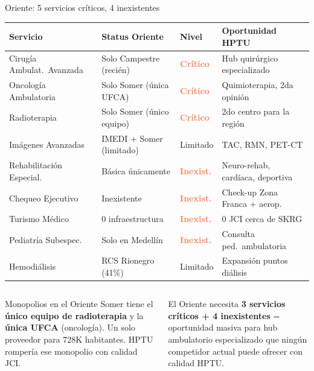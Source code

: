 \documentclass[aspectratio=169, 11pt]{beamer}
\newcommand{\danger}[1]{\textcolor{coral}{\textbf{#1}}}
\begin{document}
{
\begin{frame}{Oriente: 5 servicios críticos, 4 inexistentes}

\vspace{-2pt}
{\scriptsize\setlength{\tabcolsep}{3pt}
\begin{tabular}{@{}p{3.0cm}p{3.2cm}lp{4.0cm}@{}}
\toprule
\textbf{Servicio} & \textbf{Status Oriente} & \textbf{Nivel} & \textbf{Oportunidad HPTU} \\
\midrule
\rowcolor{coral!10}
Cirugía Ambulat.\ Avanzada & Solo Campestre (recién) & \danger{Crítico} & Hub quirúrgico especializado \\
\rowcolor{coral!10}
Oncología Ambulatoria & Solo Somer (única UFCA) & \danger{Crítico} & Quimioterapia, 2da opinión \\
\rowcolor{coral!10}
Radioterapia & Solo Somer (único equipo) & \danger{Crítico} & 2do centro para la región \\
Imágenes Avanzadas & IMEDI + Somer (limitado) & Limitado & TAC, RMN, PET-CT \\
\rowcolor{coral!6}
Rehabilitación Especial. & Básica únicamente & \danger{Inexist.} & Neuro-rehab, cardíaca, deportiva \\
\rowcolor{coral!6}
Chequeo Ejecutivo & Inexistente & \danger{Inexist.} & Check-up Zona Franca + aerop. \\
\rowcolor{coral!6}
Turismo Médico & 0 infraestructura & \danger{Inexist.} & 0 JCI cerca de SKRG \\
\rowcolor{coral!6}
Pediatría Subespec. & Solo en Medellín & \danger{Inexist.} & Consulta ped.\ ambulatoria \\
Hemodiálisis & RCS Rionegro (41\%) & Limitado & Expansión puntos diálisis \\
\bottomrule
\end{tabular}
}

\vspace{6pt}
\begin{columns}[T]
\begin{alertblock}{\small Monopolios en el Oriente}
\scriptsize
Somer tiene el \textbf{único equipo de radioterapia} y la \textbf{única UFCA} (oncología). Un solo proveedor para 728K habitantes. HPTU rompería ese monopolio con calidad JCI.
\end{alertblock}

\begin{exampleblock}{\small El Oriente necesita}
\scriptsize
\textbf{3 servicios críticos + 4 inexistentes} = oportunidad masiva para hub ambulatorio especializado que ningún competidor actual puede ofrecer con calidad HPTU.
\end{exampleblock}
\end{columns}
\end{frame}
}
\end{document}
